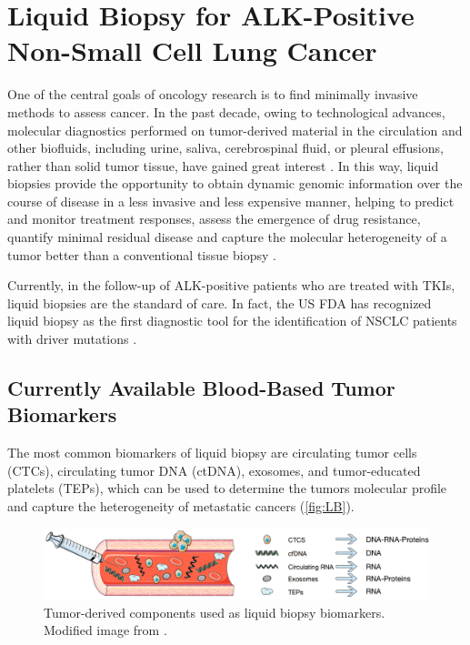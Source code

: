 \section{Liquid Biopsy for ALK-Positive Non-Small Cell Lung Cancer}

One of the central goals of oncology research is to find minimally invasive methods to assess cancer. In the past decade, owing to technological advances, molecular diagnostics performed on tumor-derived material in the circulation and other biofluids, including urine, saliva, cerebrospinal fluid, or pleural effusions, rather than solid tumor tissue, have gained great interest \cite{NSCLC_drivers}. In this way, liquid biopsies provide the opportunity to obtain dynamic genomic information over the course of disease in a less invasive and less expensive manner, helping to predict and monitor treatment responses, assess the emergence of drug resistance, quantify minimal residual disease and capture the molecular heterogeneity of a tumor better than a conventional tissue biopsy \cite{ALK_types_resistance, Liquid_biopsy_NSLC}.

Currently, in the follow-up of ALK-positive patients who are treated with TKIs, liquid biopsies are the standard of care. In fact, the US FDA has recognized liquid biopsy as the first diagnostic tool for the identification of NSCLC patients with driver mutations \cite{Liquid_biopsy_NSLC}.

\subsection{Currently Available Blood-Based Tumor Biomarkers}

The most common biomarkers of liquid biopsy are circulating tumor cells (CTCs), circulating tumor DNA (ctDNA), exosomes, and tumor-educated platelets (TEPs), which can be used to determine the tumors molecular profile and capture the heterogeneity of metastatic cancers (\autoref{fig:LB}).

\begin{figure}[ht]
    \centering
    \includegraphics[width=\textwidth]{Images/chapter_1/liquid_biopsy.png}
    \caption{Tumor-derived components used as liquid biopsy biomarkers. Modified image from \cite{LB_ed}.}
    \label{fig:LB}
\end{figure}

